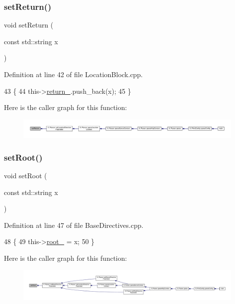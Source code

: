\subsubsection{\texorpdfstring{set\+Return()}{setReturn()}}
{\footnotesize\ttfamily void set\+Return (\begin{DoxyParamCaption}\item[{const std\+::string}]{x }\end{DoxyParamCaption})}



Definition at line 42 of file Location\+Block.\+cpp.


\begin{DoxyCode}
43     \{
44         this->\hyperlink{classft_1_1_location_block_abab721f365aff66f8a1289de21c8f01f}{return\_}.push\_back(x);
45     \}
\end{DoxyCode}
Here is the caller graph for this function\+:
\nopagebreak
\begin{figure}[H]
\begin{center}
\leavevmode
\includegraphics[width=350pt]{classft_1_1_location_block_a041d07c701e052b114ef353d5e588998_icgraph}
\end{center}
\end{figure}
\mbox{\label{classft_1_1_base_directives_a2a7990e309f7e38f2915dbbb0d2704cf}} 
\subsubsection{\texorpdfstring{set\+Root()}{setRoot()}}
{\footnotesize\ttfamily void set\+Root (\begin{DoxyParamCaption}\item[{const std\+::string}]{x }\end{DoxyParamCaption})\hspace{0.3cm}{\ttfamily [inherited]}}



Definition at line 47 of file Base\+Directives.\+cpp.


\begin{DoxyCode}
48     \{
49         this->\hyperlink{classft_1_1_base_directives_abb1eaf0bba10b90172d6152e69457dc7}{root\_} = x;
50     \}
\end{DoxyCode}
Here is the caller graph for this function\+:
\nopagebreak
\begin{figure}[H]
\begin{center}
\leavevmode
\includegraphics[width=350pt]{classft_1_1_base_directives_a2a7990e309f7e38f2915dbbb0d2704cf_icgraph}
\end{center}
\end{figure}


